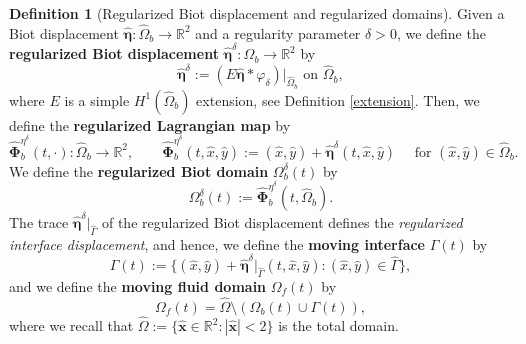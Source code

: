 \documentclass[11pt]{article}
\newcommand{\bd}{\boldsymbol}
\def\R{{\mathbb R}}
\theoremstyle{definition}
\newtheorem{definition}{Definition}[section]
\begin{document}
\begin{definition}[Regularized Biot displacement and regularized domains]\label{regulardefs}
Given a Biot displacement $\hat{\bd{\eta}}: \hat{\Omega}_{b} \to \R^{2}$ and a regularity parameter $\delta > 0$, we define the \textbf{regularized Biot displacement} $\hat{\bd{\eta}}^{\delta}: \hat{\Omega}_{b} \to \R^{2}$ by
\begin{equation*}
\hat{\bd{\eta}}^{\delta} := (E\hat{\bd{\eta}} * \varphi_{\delta})|_{\hat{\Omega}_{b}} \text{ on } \hat{\Omega}_{b},
\end{equation*}
where $E$ is a simple $H^{1}(\hat{\Omega}_{b})$ extension, see Definition \ref{extension}. Then, we define the \textbf{regularized Lagrangian map} by
\begin{equation*}
\hat{\bd{\Phi}}^{\eta^{\delta}}_{b}(t, \cdot): \hat{\Omega}_{b} \to \R^{2}, \qquad \hat{\bd{\Phi}}^{\eta^{\delta}}_{b}(t, \hat{x}, \hat{y}) := (\hat{x}, \hat{y}) + \hat{\bd{\eta}}^{\delta}(t, \hat{x}, \hat{y}) \quad \text{ for } (\hat{x}, \hat{y}) \in \hat{\Omega}_{b}.
\end{equation*}
We define the \textbf{regularized Biot domain} $\Omega^{\delta}_{b}(t)$ by
\begin{equation*}
\Omega^{\delta}_{b}(t) := \hat{\bd{\Phi}}^{\eta^{\delta}}_{b}(t, \hat{\Omega}_{b}).
\end{equation*}
The trace $\hat{\bd{\eta}}^{\delta}|_{\hat{\Gamma}}$ of the regularized Biot displacement defines the \textit{regularized interface displacement}, and hence, we define the \textbf{moving interface} $\Gamma(t)$ by
\begin{equation*}
\Gamma(t) := \{(\hat{x}, \hat{y}) + \hat{\bd{\eta}}^{\delta}|_{\hat{\Gamma}}(t, \hat{x}, \hat{y}) : (\hat{x}, \hat{y}) \in \hat{\Gamma}\},
\end{equation*}
and we define the \textbf{moving fluid domain} $\Omega_{f}(t)$ by
\begin{equation*}
\Omega_{f}(t) = \hat{\Omega} \setminus (\Omega_{b}(t) \cup \Gamma(t)),
\end{equation*}
where we recall that $\hat{\Omega} := \{\hat{\bd{x}} \in \R^{2} : |\hat{\bd{x}}| < 2\}$ is the total domain.
\end{definition}
\end{document}
